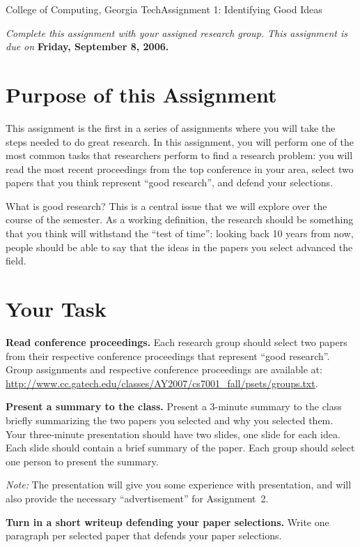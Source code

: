 \documentclass[11pt]{article}
\begin{document}


{College of Computing, Georgia Tech}{Assignment 1: Identifying Good Ideas}

{\em Complete this assignment with your assigned research group.  This
  assignment is due on} {\bf Friday, September 8, 2006.}

\section{Purpose of this Assignment}

This assignment is the first in a series of assignments where you will
take the steps needed to do great research.  In this assignment, you
will perform one of the most common tasks that researchers perform to
find a research problem: you will read the most recent proceedings from
the top conference in your area, select two papers that you think
represent ``good research'', and defend your selections.

What is good research?  This is a central issue that we will explore
over the course of the semester.  As a working definition, the research
should be something that you think will withstand the ``test of time'':
looking back 10 years from now, people should be able to say that the
ideas in the papers you select advanced the field.

\section{Your Task}

{\bf Read conference proceedings.}  Each research group should select
two papers from their respective conference proceedings that represent
``good research''.  Group assignments and respective conference
proceedings are available at: \\
\url{http://www.cc.gatech.edu/classes/AY2007/cs7001_fall/psets/groups.txt}.

{\bf Present a summary to the class.}  Present a 3-minute summary to the
class briefly summarizing the two papers you selected and why you
selected them.  Your three-minute presentation should have two slides,
one slide for each idea.  Each slide should contain a brief summary of
the paper.  Each group should select one person to present the summary.

{\em Note:} The presentation will give you some experience with presentation,
and will also provide the necessary ``advertisement'' for
Assignment~2.

{\bf Turn in a short writeup defending your paper selections.}  Write
one paragraph per selected paper that defends your paper selections.
\end{document}
